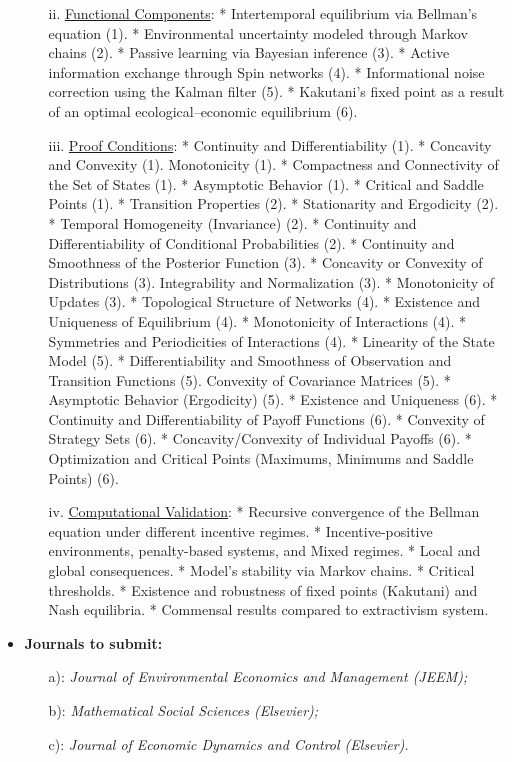 \begin{itemize}
\begin{itemize}
    \item[ii.] \underline{Functional Components}: * Intertemporal equilibrium via Bellman's equation (1). * Environmental uncertainty modeled through Markov chains (2). * Passive learning via Bayesian inference (3). * Active information exchange through Spin networks (4). * Informational noise correction using the Kalman filter (5). * Kakutani’s fixed point as a result of an optimal ecological–economic equilibrium (6).
    
    \item[iii.] \underline{Proof Conditions}: * Continuity and Differentiability (1). * Concavity and Convexity (1). Monotonicity (1). * Compactness and Connectivity of the Set of States (1). * Asymptotic Behavior (1). * Critical and Saddle Points (1). * Transition Properties (2). * Stationarity and Ergodicity (2). * Temporal Homogeneity (Invariance) (2). * Continuity and Differentiability of Conditional Probabilities (2). * Continuity and Smoothness of the Posterior Function (3). * Concavity or Convexity of Distributions (3). Integrability and Normalization (3). * Monotonicity of Updates (3). * Topological Structure of Networks (4). * Existence and Uniqueness of Equilibrium (4). * Monotonicity of Interactions (4). * Symmetries and Periodicities of Interactions (4). * Linearity of the State Model (5). * Differentiability and Smoothness of Observation and Transition Functions (5). Convexity of Covariance Matrices (5). * Asymptotic Behavior (Ergodicity) (5). * Existence and Uniqueness (6). * Continuity and Differentiability of Payoff Functions (6). * Convexity of Strategy Sets (6). * Concavity/Convexity of Individual Payoffs (6). * Optimization and Critical Points (Maximums, Minimums and Saddle Points) (6). %
    
    \item[iv.] \underline{Computational Validation}: * Recursive convergence of the Bellman equation under different incentive regimes. * Incentive-positive environments, penalty-based systems, and Mixed regimes. * Local and global consequences. * Model’s stability via Markov chains. * Critical thresholds. * Existence and robustness of fixed points (Kakutani) and Nash equilibria. * Commensal results compared to extractivism system. 
  
  \end{itemize}
  
    \item \textbf{Journals to submit:}
        \begin{itemize}
            \item[a):] \textit{Journal of Environmental Economics and Management (JEEM);}
            \item[b):] \textit{Mathematical Social Sciences (Elsevier);}
            \item[c):] \textit{Journal of Economic Dynamics and Control (Elsevier).}
        \end{itemize}

\end{itemize}

